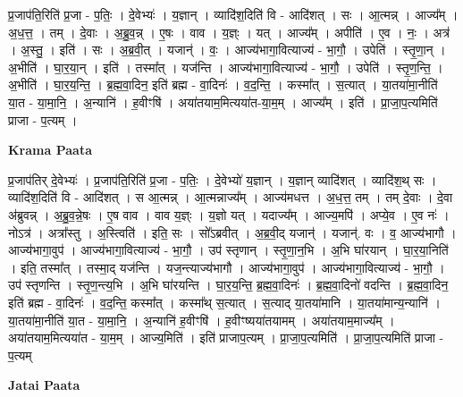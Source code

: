 \documentclass[17pt]{extarticle}
\begin{document}
प्र॒जाप॑ति॒रिति॑ प्र॒जा - प॒तिः॒ । दे॒वेभ्यः॑ । य॒ज्ञान् । व्यादि॑श॒दिति॑ वि - आदि॑शत् । सः । आ॒त्मन्न् । आज्य᳚म् । अ॒ध॒त्त॒ । तम् । दे॒वाः । अ॒ब्रु॒व॒न्न् । ए॒षः । वाव । य॒ज्ञ्ः । यत् । आज्य᳚म् । अपीति॑ । ए॒व । नः॒ । अत्र॑ । अ॒स्तु॒ । इति॑ । सः । अ॒ब्र॒वी॒त् । यजान्॑ । वः॒ । आज्य॑भागा॒वित्याज्य॑ - भा॒गौ॒ । उपेति॑ । स्तृ॒णा॒न् । अ॒भीति॑ । घा॒र॒या॒न् । इति॑ । तस्मा᳚त् । यज॑न्ति । आज्य॑भागा॒वित्याज्य॑ - भा॒गौ॒ । उपेति॑ । स्तृ॒ण॒न्ति॒ । अ॒भीति॑ । घा॒र॒य॒न्ति॒ । ब्र॒ह्म॒वा॒दिन॒ इति॑ ब्रह्म - वा॒दिनः॑ । व॒द॒न्ति॒ । कस्मा᳚त् । स॒त्यात् । या॒तया॑मा॒नीति॑ या॒त - या॒मा॒नि॒ । अ॒न्यानि॑ । ह॒वीꣳषि॑ । अया॑तयाम॒मित्यया॑त-या॒म॒म् । आज्य᳚म् । इति॑ । प्रा॒जा॒प॒त्यमिति॑ प्राजा - प॒त्यम् ।  \newline


\textbf{Krama Paata} \newline

प्र॒जाप॑तिर् दे॒वेभ्यः॑ । प्र॒जाप॑ति॒रिति॑ प्र॒जा - प॒तिः॒ । दे॒वेभ्यो॑ य॒ज्ञान् । य॒ज्ञान् व्यादि॑शत् । व्यादि॑श॒थ् सः । व्यादि॑श॒दिति॑ वि - आदि॑शत् । स आ॒त्मन्न् । आ॒त्मन्नाज्य᳚म् । आज्य॑मधत्त । अ॒ध॒त्त॒ तम् । तम् दे॒वाः । दे॒वा अ॑ब्रुवन्न् । अ॒ब्रु॒व॒न्ने॒षः । ए॒ष वाव । वाव य॒ज्ञ्ः । य॒ज्ञो यत् । यदाज्य᳚म् । आज्य॒मपि॑ । अप्ये॒व । ए॒व नः॑ । नोऽत्र॑ । अत्रा᳚स्तु । अ॒स्त्विति॑ । इति॒ सः । सो᳚ऽब्रवीत् । अ॒ब्र॒वी॒द् यजान्॑ । यजान्॑. वः । व॒ आज्य॑भागौ । आज्य॑भागा॒वुप॑ । आज्य॑भागा॒वित्याज्य॑ - भा॒गौ॒ । उप॑ स्तृणान् । स्तृ॒णा॒न॒भि । अ॒भि घा॑रयान् । घा॒र॒या॒निति॑ । इति॒ तस्मा᳚त् । तस्मा॒द् यज॑न्ति । यज॒न्त्याज्य॑भागौ । आज्य॑भागा॒वुप॑ । आज्य॑भागा॒वित्याज्य॑ - भा॒गौ॒ । उप॑ स्तृणन्ति । स्तृ॒ण॒न्त्य॒भि । अ॒भि घा॑रयन्ति । घा॒र॒य॒न्ति॒ ब्र॒ह्म॒वा॒दिनः॑ । ब्र॒ह्म॒वा॒दिनो॑ वदन्ति । ब्र॒ह्म॒वा॒दिन॒ इति॑ ब्रह्म - वा॒दिनः॑ । व॒द॒न्ति॒ कस्मा᳚त् । कस्मा᳚थ् स॒त्यात् । स॒त्याद् या॒तया॑मानि । या॒तया॑मान्य॒न्यानि॑ । या॒तया॑मा॒नीति॑ या॒त - या॒मा॒नि॒ । अ॒न्यानि॑ ह॒वीꣳषि॑ । ह॒वीꣳष्यया॑तयामम् । अया॑तयाम॒माज्य᳚म् । अया॑तयाम॒मित्यया॑त - या॒म॒म् । आज्य॒मिति॑ । इति॑ प्राजाप॒त्यम् । प्रा॒जा॒प॒त्यमिति॑ । प्रा॒जा॒प॒त्यमिति॑ प्राजा - प॒त्यम् \newline

\textbf{Jatai Paata} \newline
\end{document}
